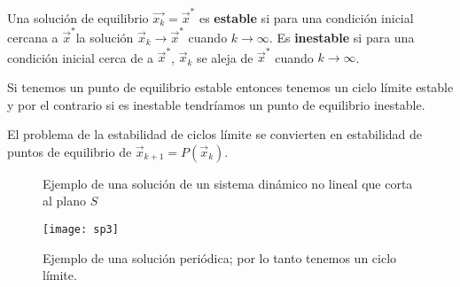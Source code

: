 \begin{tcolorbox}[colback=Black!4, colframe=White,arc=2mm]
\begin{nota}
	Una solución de equilibrio $\vec{x_k}=\vec{x}^*$ es \textbf{estable} si para una condición inicial cercana a $\vec{x}^*$la solución $\vec{x}_k \to \vec{x}^*$ cuando $k \to \infty$.  Es \textbf{inestable} si para una condición inicial cerca de a $\vec{x}^*$, $\vec{x}_k$ se aleja de $\vec{x}^*$ cuando $k \to \infty$.
\end{nota}
\end{tcolorbox}
\begin{tcolorbox}[colback=Black!4, colframe=White,arc=2mm]
\begin{nota}Si tenemos un punto de equilibrio estable entonces tenemos un ciclo límite estable y por el contrario si es inestable tendríamos un punto de equilibrio inestable. 
\end{nota}
\end{tcolorbox}
El problema de la estabilidad de ciclos límite se convierten en estabilidad de puntos de equilibrio de $\vec{x}_{k+1}=P(\vec{x}_k)$.
\begin{figure}[htb]
 \centering
  \subfloat[]{
    \texttt{[image: sp4]}} \hfill
		\caption{Ejemplo de una solución de un sistema dinámico no lineal que corta al plano $S$}
\end{figure} 
\begin{figure}[htb]
	\centering
	\texttt{[image: sp3]}
	\caption{Ejemplo de una solución periódica; por lo tanto tenemos un ciclo límite.}
\end{figure}


